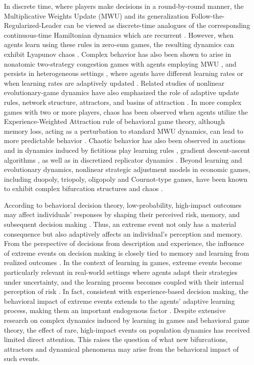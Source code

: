 \documentclass{article}
\theoremstyle{plain}
\theoremstyle{definition}
\begin{document}
In discrete time, where players make decisions in a round-by-round manner, the Multiplicative Weights Update (MWU) \cite{freund} and its generalization Follow-the-Regularized-Leader can be viewed as discrete-time analogues of the corresponding continuous-time Hamiltonian dynamics which are recurrent \cite{bailey4,boone}. However, when agents learn using these rules in zero-sum games, the resulting dynamics can exhibit Lyapunov chaos \cite{mertikopoulos1,bailey,cheung1,cheung2}. Complex behavior has also been shown to arise in nonatomic two-strategy congestion games with agents employing MWU \cite{palaiopanos,chotibut1,chotibut2,bielawski}, and persists in heterogeneous settings \cite{bielawski2}, where agents have different learning rates \cite{hadhikanloo} or when learning rates are adaptively updated \cite{vlatakis1}. Related studies of nonlinear evolutionary-game dynamics have also emphasized the role of adaptive update rules, network structure, attractors, and basins of attraction \cite{hakhamanesh,sun}. In more complex games with two or more players, chaos has been observed when agents utilize the Experience-Weighted Attraction rule of behavioral game theory, although memory loss, acting as a perturbation to standard MWU dynamics, can lead to more predictable behavior \cite{galla,sanders,bielawski3,pangallo2}. Chaotic behavior has also been observed in auctions \cite{cheung3} and in dynamics induced by fictitious play learning rules \cite{sparrow,vanStrien}, gradient descent-ascent algorithms \cite{bailey2}, as well as in discretized replicator dynamics \cite{mukhopadhyay,pandit,vilone}. Beyond learning and evolutionary dynamics, nonlinear strategic adjustment models in economic games, including duopoly, triopoly, oligopoly and Cournot-type games, have been known to exhibit complex bifurcation structures and chaos \cite{puu,kopel,tramontana,matouk,andaluz,wei}.

According to behavioral decision theory, low-probability, high-impact outcomes may affect individuals' responses by shaping their perceived risk, memory, and subsequent decision making \cite{kahnemann1,kahnemann2}. Thus, an extreme event not only has a material consequence but also adaptively affects an individual's perception and memory. From the perspective of decisions from description and experience, the influence of extreme events on decision making is closely tied to memory and learning from realized outcomes \cite{plonsky,hertwig}. In the context of learning in games, extreme events become particularly relevant in real-world settings where agents adapt their strategies under uncertainty, and the learning process becomes coupled with their internal perception of risk \cite{camerer,camerer2}. In fact, consistent with experience-based decision making, the behavioral impact of extreme events extends to the agents' adaptive learning process, making them an important endogenous factor \cite{plonsky2}. Despite extensive research on complex dynamics induced by learning in games and behavioral game theory, the effect of rare, high-impact events on population dynamics has received limited direct attention. This raises the question of what new bifurcations, attractors and dynamical phenomena may arise from the behavioral impact of such events. 
\end{document}
